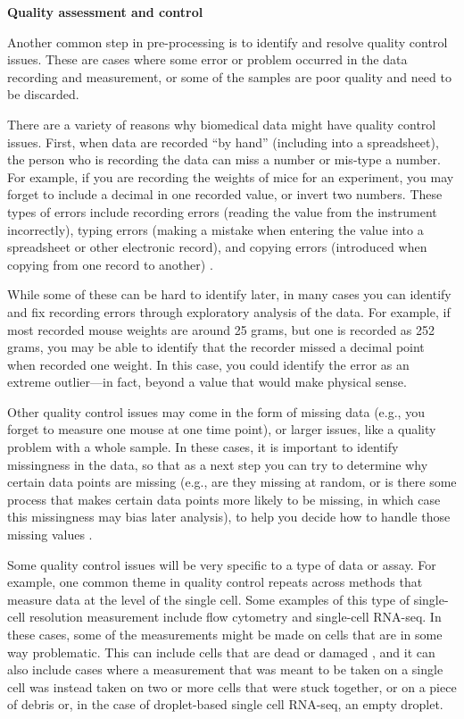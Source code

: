 \documentclass[]{tufte-book}
\begin{document}
\textbf{Quality assessment and control}

Another common step in pre-processing is to identify and resolve quality control
issues. These are cases where some error or problem occurred in the data
recording and measurement, or some of the samples are poor quality and need to
be discarded.

There are a variety of reasons why biomedical data might have quality control
issues. First, when data are recorded ``by hand'' (including into a spreadsheet),
the person who is recording the data can miss a number or mis-type a number. For
example, if you are recording the weights of mice for an experiment, you may
forget to include a decimal in one recorded value, or invert two numbers. These
types of errors include recording errors (reading the value from the instrument
incorrectly), typing errors (making a mistake when entering the value into a
spreadsheet or other electronic record), and copying errors (introduced when
copying from one record to another) \citep{chatfield1995problem}.

While some of these can be hard to identify later, in many cases you can
identify and fix recording errors through exploratory analysis of the data. For
example, if most recorded mouse weights are around 25 grams, but one is recorded
as 252 grams, you may be able to identify that the recorder missed a decimal point
when recorded one weight. In this case, you could identify the error as
an extreme outlier---in fact, beyond a value that would make physical sense.

Other quality control issues may come in the form of missing data (e.g., you
forget to measure one mouse at one time point), or larger issues, like a quality
problem with a whole sample. In these cases, it is important to
identify missingness in the data, so that as a next step you can try to
determine why certain data points are missing (e.g., are they missing at random,
or is there some process that makes certain data points more likely to be
missing, in which case this missingness may bias later analysis), to help you
decide how to handle those missing values \citep{chatfield1995problem}.

Some quality control issues will be very specific to a type of data or assay.
For example, one common theme in quality control repeats across methods
that measure data at the level of the single cell. Some examples of this type of
single-cell resolution measurement include flow cytometry and single-cell
RNA-seq. In these cases, some of the measurements might be made on cells that
are in some way problematic. This can include cells that are dead or damaged
\citep{ilicic2016classification}, and it can also include cases where a measurement
that was meant to be taken on a single cell was instead taken on two or more
cells that were stuck together, or on a piece of debris or, in the case of
droplet-based single cell RNA-seq, an empty droplet.
\end{document}
